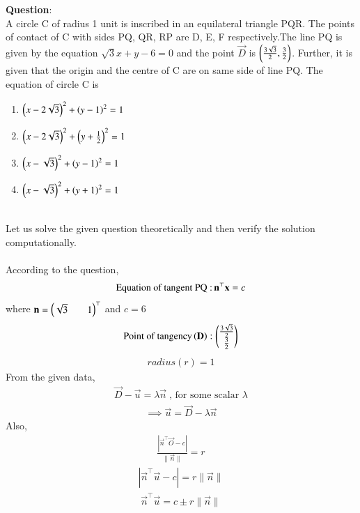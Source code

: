 \documentclass[journal]{IEEEtran}
\begin{document}
\textbf{Question}:\\
A circle C of radius 1 unit is inscribed in an equilateral triangle PQR. The points of contact of C with sides PQ, QR, RP are D, E, F respectively.The line PQ is given by the equation
$\sqrt{3}x+y-6=0$ and the point $\vec{D}$ is $\brak{\frac{3\sqrt{3}}{2},\frac{3}{2}}$. Further, it is given
that the origin and the centre of C are on same side of line PQ. The equation of circle C is
\begin{multicols}{2}
\begin{enumerate}
    \item $\brak{x-2\sqrt{3}}^2+\brak{y-1}^2=1$
    \item $\brak{x-2\sqrt{3}}^2+\brak{y+\frac{1}{2}}^2=1$
    \item $\brak{x-\sqrt{3}}^2+\brak{y-1}^2=1$
    \item $\brak{x-\sqrt{3}}^2+\brak{y+1}^2=1$
\end{enumerate}
\end{multicols}
\solution \\
Let us solve the given question theoretically and then verify the solution computationally.\\
\\
According to the question,
\begin{align}
    \text{Equation of tangent PQ :\,}\vec{n}^{\top}\vec{x}=c
\end{align}
where $\vec{n}=\myvec{\sqrt{3}&&1}^{\top}$ and $c=6$
\begin{align}
    \text{Point of tangency}\brak{\vec{D}}:\myvec{\frac{3\sqrt{3}}{2}\\\frac{3}{2}}
\end{align}
\begin{align}
    radius(r)=1
\end{align}
From the given data,
\begin{align}
    \vec{D}-\vec{u}=\lambda\vec{n}\;\text{, for some scalar $\lambda$}
\end{align}
\begin{align}
    \implies \vec{u}=\vec{D}-\lambda\vec{n}
\end{align}
Also,
\begin{align}
    \frac{|\vec{n}^{\top}\vec{O}-c|}{\|\vec{n}\|}=r
\end{align}
\begin{align}
    |\vec{n}^{\top}\vec{u}-c|=r\|\vec{n}\|
\end{align}
\begin{align}
    \vec{n}^{\top}\vec{u}=c \pm r\|\vec{n}\|
\end{align}
\end{document}

